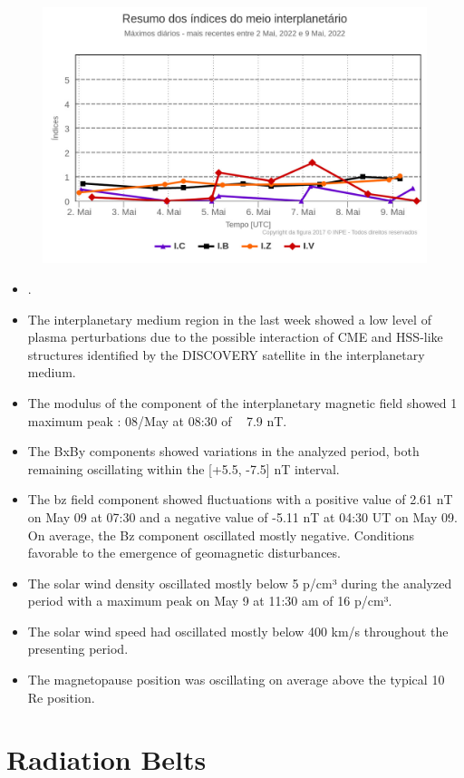 \documentclass[a4paper, 10pt]{article}
\begin{document}
 \begin{figure}[H]
    \centering
    \includegraphics[width=14cm]{./figures//figureMIIndex.png}
\end{figure}
 \begin{itemize}
 \item .
\item The interplanetary medium region in the last week showed a low level of plasma perturbations due to the possible interaction of CME and HSS-like structures identified by the DISCOVERY satellite in the interplanetary medium.
\item  The modulus of the component of the interplanetary magnetic field showed 1 maximum peak : 08/May at 08:30 of ~ 7.9 nT. 
\item The BxBy components showed variations in the analyzed period, both remaining oscillating within the [+5.5, -7.5] nT interval.
\item  The bz field component showed fluctuations with a positive value of 2.61 nT on May 09 at 07:30 and a negative value of -5.11 nT at 04:30 UT on May 09. On average, the Bz component oscillated mostly negative. Conditions favorable to the emergence of geomagnetic disturbances.
\item  The solar wind density oscillated mostly below 5 p/cm³ during the analyzed period with a maximum peak on May 9 at 11:30 am of 16 p/cm³. 
\item The solar wind speed had oscillated mostly below 400 km/s throughout the presenting period. 
\item The magnetopause position was oscillating on average above the typical 10 Re position.
\end{itemize} 
\section{Radiation Belts} 
\end{document}
